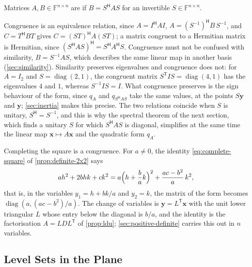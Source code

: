 \begin{definition}[Congruence]
\label{def:congruence}
Matrices $A,B\in\mathbb F^{n\times n}$ are  if $B=S^{\mathsf H}AS$ for an invertible $S\in\mathbb F^{n\times n}$.
\end{definition}

Congruence is an equivalence relation, since $A=I^{\mathsf H}AI$, $A=(S^{-1})^{\mathsf H}B\,S^{-1}$, and $C=T^{\mathsf H}BT$ gives $C=(ST)^{\mathsf H}A(ST)$; a matrix congruent to a Hermitian matrix is Hermitian, since $(S^{\mathsf H}AS)^{\mathsf H}=S^{\mathsf H}A^{\mathsf H}S$. Congruence must not be confused with similarity, $B=S^{-1}AS$, which describes the same linear map in another basis (\cref{sec:similarity}). Similarity preserves eigenvalues and congruence does not: for $A=I_2$ and $S=\operatorname{diag}(2,1)$, the congruent matrix $S^{\mathsf T}IS=\operatorname{diag}(4,1)$ has the eigenvalues $4$ and $1$, whereas $S^{-1}IS=I$. What congruence preserves is the sign behaviour of the form, since $q_A$ and $q_{S^{\mathsf H}AS}$ take the same values, at the points $S\mathbf y$ and $\mathbf y$; \cref{sec:inertia} makes this precise. The two relations coincide when $S$ is unitary, $S^{\mathsf H}=S^{-1}$, and this is why the spectral theorem of the next section, which finds a unitary $S$ for which $S^{\mathsf H}AS$ is diagonal, simplifies at the same time the linear map $\mathbf x\mapsto A\mathbf x$ and the quadratic form $q_A$.

Completing the square is a congruence. For $a\ne0$, the identity \eqref{eq:complete-square} of \cref{prop:definite-2x2} says
\[
ah^2+2bhk+ck^2=a\Bigl(h+\frac bak\Bigr)^2+\frac{ac-b^2}a\,k^2 ,
\]
that is, in the variables $y_1=h+bk/a$ and $y_2=k$, the matrix of the form becomes $\operatorname{diag}(a,(ac-b^2)/a)$. The change of variables is $\mathbf y=L^{\mathsf T}\mathbf x$ with the unit lower triangular $L$ whose entry below the diagonal is $b/a$, and the identity is the factorisation $A=LDL^{\mathsf T}$ of \cref{prop:ldu}; \cref{sec:positive-definite} carries this out in $n$ variables.

\subsection{Level Sets in the Plane}

